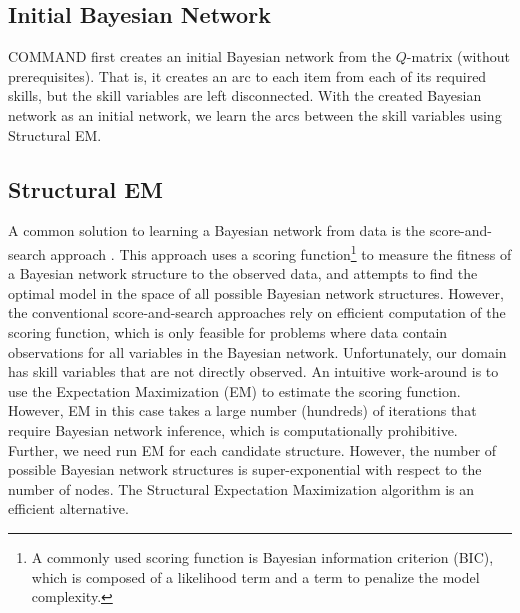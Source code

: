 \documentclass{edm_template}
\begin{document}
\subsection{Initial Bayesian Network}
\label{sec:initial_bn}
COMMAND first creates an initial Bayesian network from the  $Q$-matrix (without prerequisites).
That is, it creates an arc to each item from each of its required skills,  but the skill variables  are left disconnected.
With the created Bayesian network as an initial network, we learn the arcs between the skill variables using Structural EM.

\subsection{Structural EM}
\label{sec:sem}

A common solution to learning a Bayesian network from data is the score-and-search approach \cite{cooper1992bayesian,heckerman1997bayesian}.
This approach uses a scoring function\footnote{A commonly used scoring function is Bayesian information criterion (BIC), which is composed of a likelihood term and a term to penalize the model complexity.} to measure the fitness of a Bayesian network structure to the observed data, 
and attempts to find the optimal model in the space of all possible Bayesian network structures.
However, the conventional score-and-search approaches rely on efficient computation of the scoring function, 
which is only feasible for problems where data contain observations for all variables in the Bayesian network.
Unfortunately, our domain has skill variables that are not directly observed.
An intuitive work-around is to use the Expectation Maximization (EM) to estimate the scoring function.
However, EM in this case takes a large number (hundreds) of iterations that require Bayesian network inference, which is computationally prohibitive.
Further, we need run EM for each candidate structure. However, the number of possible Bayesian network structures is super-exponential with respect to the number of nodes.
The Structural Expectation Maximization algorithm \cite{friedman1997learning} is an efficient alternative.
\end{document}
